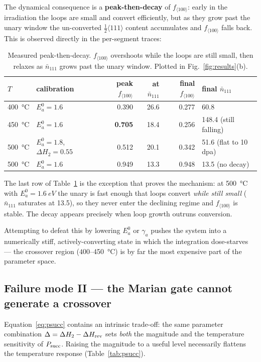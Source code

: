 \documentclass[11pt,a4paper]{article}
\newcommand{\fhkl}{f_{\langle100\rangle}}
\newcommand{\bv}{\tfrac12\langle111\rangle}
\begin{document}
The dynamical consequence is a \textbf{peak-then-decay} of $\fhkl$: early in the
irradiation the loops are small and convert efficiently, but as they grow past
the unary window the un-converted $\bv$ content accumulates and $\fhkl$ falls
back. This is observed directly in the per-segment traces:

\begin{table}[h]
\centering
\caption{Measured peak-then-decay. $\fhkl$ overshoots while the loops are still
small, then relaxes as $\bar n_{111}$ grows past the unary window. Plotted in
Fig.~\ref{fig:results}(b).}
\label{tab:transient}
\begin{tabular}{llrrrl}
\toprule
$T$ & calibration & peak $\fhkl$ & at $\bar n_{111}$ & final $\fhkl$ &
final $\bar n_{111}$ \\
\midrule
\SI{400}{\celsius} & $E_a^0=1.6$ & 0.390 & 26.6 & 0.277 & 60.8 \\
\SI{450}{\celsius} & $E_a^0=1.6$ & \textbf{0.705} & 18.4 & 0.256 & 148.4 (still falling) \\
\SI{500}{\celsius} & $E_a^0=1.8$, $\Delta H_2=0.55$ & 0.512 & 20.1 & 0.342 & 51.6 (flat to 10 dpa) \\
\SI{500}{\celsius} & $E_a^0=1.6$ & 0.949 & 13.3 & 0.948 & 13.5 (no decay) \\
\bottomrule
\end{tabular}
\end{table}

\noindent
The last row of Table~\ref{tab:transient} is the exception that proves the
mechanism: at \SI{500}{\celsius} with $E_a^0=\SI{1.6}{eV}$ the unary is fast
enough that loops convert \emph{while still small} ($\bar n_{111}$ saturates at
13.5), so they never enter the declining regime and $\fhkl$ is stable. The decay
appears precisely when loop growth outruns conversion.

Attempting to defeat this by lowering $E_a^0$ or $\gamma_a$ pushes the system
into a numerically stiff, actively-converting state in which the integration
dose-starves --- the crossover region ($400$--\SI{450}{\celsius}) is by far the
most expensive part of the parameter space.

\subsection{Failure mode II --- the Marian gate cannot generate a crossover}

Equation~\eqref{eq:psucc} contains an intrinsic trade-off: the same parameter
combination $\Delta=\Delta H_2-\Delta H_{\rm rev}$ sets \emph{both} the magnitude
and the temperature sensitivity of $P_{\rm succ}$. Raising the magnitude to a
useful level necessarily flattens the temperature response
(Table~\ref{tab:psucc}).
\end{document}
